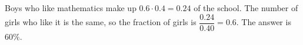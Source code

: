 Boys who like mathematics make up $0.6\cdot0.4=0.24$ of the school. The number of girls who like it is the same, so the fraction of girls is $\dfrac{0.24}{0.40}=0.6$. The answer is $\boxed{60\%}$.
